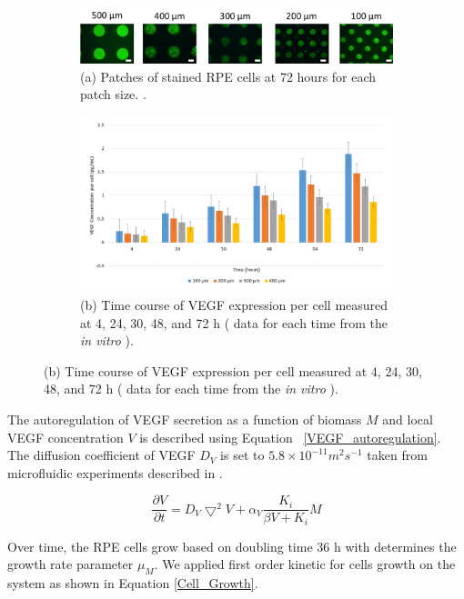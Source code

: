  \begin{figure}[!t]
  \centering

 \begin{subfigure}{.5\textwidth}
   \centering
   \includegraphics[width=.8\linewidth]{./figures/in_vitro_crop.png}
   \caption{(a) Patches of stained RPE cells at 72 hours for each patch size. \cite{qanitabaker:Vargis2014Effect}.}

 \end{subfigure}%

 \begin{subfigure}{.5\textwidth}
   \centering
   \includegraphics[width=.8\linewidth]{./figures/Results/In-Vitro.png}
   \caption{(b) Time course of VEGF expression per cell measured at 4, 24, 30, 48, and 72 h ( data for each time from the \textit{in vitro} \cite{qanitabaker:Vargis2014Effect} ).}
 \end{subfigure}%
\label{in_vitro_experiment}
\end{figure}

 The autoregulation of VEGF secretion as a function of biomass $M$ and local VEGF concentration $V$ is described using Equation ~\ref{VEGF_autoregulation}. The diffusion coefficient of VEGF $D_{V}$ is set to $5.8 \times 10^{-11} m^{2} s^{-1}$ taken from microfluidic experiments described in \cite{qanitabaker:Shin2012Microfluidic}.

 \begin{equation}
 \frac{\partial V}{\partial t}=D_{V}\bigtriangledown^{2} V+ \alpha_V  \frac{K_i}{ \beta V+K_i} M
 \label{VEGF_autoregulation}
 \end{equation}

Over time, the RPE cells grow based on doubling time 36 h \cite{qanitabaker:Bryckaert2000Regulation} with determines the growth rate parameter $\mu _{M}$. We applied first order kinetic for cells growth on the system as shown in Equation \ref{Cell_Growth}.\\


